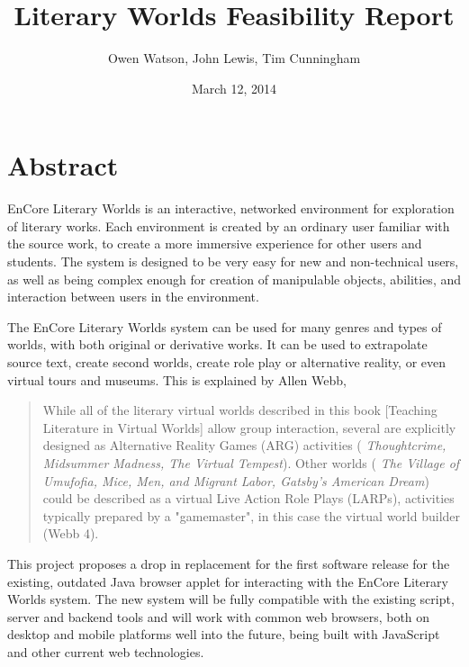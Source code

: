 \documentclass[12pt, letterpaper]{report}
\author{Owen Watson, John Lewis, Tim Cunningham}
\title{Literary Worlds Feasibility Report}
\date{March 12, 2014}
\begin{document}
	\begin{titlepage}
	\Huge \maketitle \par
	\end{titlepage}
	
	\chapter{Abstract}
	\par
	EnCore Literary Worlds is an interactive, networked environment for exploration of literary works. Each environment is created by an ordinary user familiar with the source work, to create a more immersive experience for other users and students. The system is designed to be very easy for new and non-technical users, as well as being complex enough for creation of manipulable objects, abilities, and interaction between users in the environment.
	
	\par
	The EnCore Literary Worlds system can be used for many genres and types of worlds, with both original or derivative works. It can be used to extrapolate source text, create second worlds, create role play or alternative reality, or even virtual tours and museums. This is explained by Allen Webb,
	
	\begin{quotation}
	While all of the literary virtual worlds described in this book [Teaching Literature in Virtual Worlds] allow group interaction, several are explicitly designed as Alternative Reality Games (ARG) activities (%
	\textit{Thoughtcrime, Midsummer Madness, The Virtual Tempest}). Other worlds (%
	\textit{The Village of Umufofia, Mice, Men, and Migrant Labor, Gatsby's American Dream})
	could be described as a virtual Live Action Role Plays (LARPs), activities typically prepared by a "gamemaster", in this case the virtual world builder (Webb 4).
	\end{quotation}
	
	\par
	This project proposes a drop in replacement for the first software release for the existing, outdated Java browser applet for interacting with the EnCore Literary Worlds system. The new system will be fully compatible with the existing script, server and backend tools and will work with common web browsers, both on desktop and mobile platforms well into the future, being built with JavaScript and other current web technologies.
	
\end{document}
